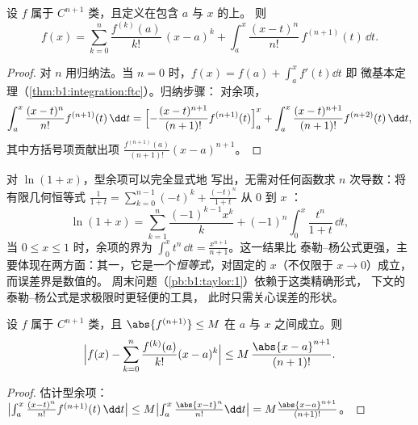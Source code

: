 \begin{theorem}[积分型余项的泰勒公式]\label{thm:b1:taylor:integral}
设 $f$ 属于 $C^{n+1}$ 类，且定义在包含 $a$ 与 $x$ 的上。
则
\[
f(x) = \sum_{k=0}^{n} \frac{f^{(k)}(a)}{k!}\,(x - a)^k
+ \int_a^x \frac{(x - t)^n}{n!}\, f^{(n+1)}(t)\, \dd t .
\]
\end{theorem}

\begin{proof}
对 $n$ 用归纳法。当 $n = 0$ 时，$f(x) = f(a) + \int_a^x f'(t)\dd t$ 即
微基本定理（\cref{thm:b1:integration:ftc}）。归纳步骤：
对余项，
\[
\int_a^x \frac{(x-t)^n}{n!} f^{(n+1)}(t)\,\dd t
= \Bigl[-\frac{(x-t)^{n+1}}{(n+1)!} f^{(n+1)}(t)\Bigr]_a^x
+ \int_a^x \frac{(x-t)^{n+1}}{(n+1)!} f^{(n+2)}(t)\,\dd t ,
\]
其中方括号项贡献出项 $\frac{f^{(n+1)}(a)}{(n+1)!}(x -
a)^{n+1}$。
\end{proof}

\begin{example}[精确展开及其余项]\label{ex:b1:taylor:lnexact}
对 $\ln(1 + x)$，型余项可以完全显式地
写出，无需对任何函数求 $n$ 次导数：将有限几何恒等式
$\frac{1}{1+t} =
\sum_{k=0}^{n-1}(-t)^k + \frac{(-t)^n}{1+t}$ 从 $0$ 到 $x$ ：
\[
\ln(1 + x) = \sum_{k=1}^{n} \frac{(-1)^{k-1}x^k}{k}
+ (-1)^n \int_0^x \frac{t^n}{1 + t}\,\dd t ,
\]
当 $0 \leq x \leq 1$ 时，余项的界为 $\int_0^x
t^n\,\dd t = \frac{x^{n+1}}{n+1}$。这一结果比
泰勒–杨公式更强，主要体现在两方面：其一，它是一个\emph{恒等式}，对固定的
$x$（不仅限于 $x \to 0$）成立，而误差界是数值的。
周末问题（\cref{pb:b1:taylor:1}）依赖于这类精确形式，
下文的泰勒–杨公式是求极限时更轻便的工具，
此时只需关心误差的形状。
\end{example}

\begin{theorem}[泰勒–拉格朗日不等式]\label{thm:b1:taylor:lagrange}
设 $f$ 属于 $C^{n+1}$ 类，且 $\abs{f^{(n+1)}} \leq M$ 在
$a$ 与 $x$ 之间成立。则
\[
\Bigl| f(x) - \sum_{k=0}^{n} \frac{f^{(k)}(a)}{k!}(x-a)^k \Bigr|
\leq M\, \frac{\abs{x - a}^{n+1}}{(n+1)!} .
\]
\end{theorem}

\begin{proof}
估计型余项：$\bigl|\int_a^x \frac{(x-t)^n}{n!}
f^{(n+1)}(t)\,\dd t\bigr| \leq M \bigl|\int_a^x
\frac{\abs{x-t}^n}{n!}\dd t\bigr| = M\frac{\abs{x-a}^{n+1}}{(n+1)!}$。
\end{proof}

